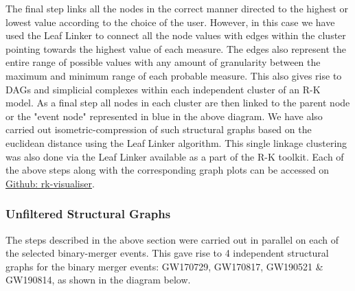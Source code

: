 The final step links all the nodes in the correct manner directed to the highest or lowest value according to the choice of the user. However, in this case we have used the Leaf Linker to connect all the node values with edges within the cluster pointing towards the highest value of each measure. The edges also represent the entire range of possible values with any amount of granularity between the maximum and minimum range of each probable measure. This also gives rise to DAGs and simplicial complexes within each independent cluster of an R-K model. As a final step all nodes in each cluster are then linked to the parent node or the "event node" represented in blue in the above diagram. We have also carried out isometric-compression of such structural graphs based on the euclidean distance using the Leaf Linker algorithm. This single linkage clustering was also done via the Leaf Linker available as a part of the R-K toolkit. Each of the above steps along with the corresponding graph plots can be accessed on \href{https://github.com/animikhroy/rk_toolkit_pipeline_diagrams/tree/main/03_rk-visualizer}{Github: rk-visualiser}.

\subsubsection{Unfiltered Structural Graphs}


The steps described in the above section were carried out in parallel on each of the selected binary-merger events. This gave rise to 4 independent structural graphs for the binary merger events:  GW170729, GW170817, GW190521 \& GW190814, as shown in the diagram below.

